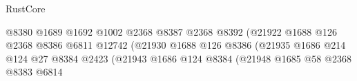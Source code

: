 \begin{lexlean}{RustCore}
\begin{coremodule}
                                                              @8380
                                                              @1689
                                                              @1692
                                                              @1002
                                                              @2368
                                                              @8387
                                                              @2368
                                                              @8392
                                                              (@21922
                                                                @1688
                                                                @126
                                                                @2368
                                                                @8386
                                                                @6811
                                                                @12742
                                                                (@21930
                                                                  @1688
                                                                  @126
                                                                  @8386
                                                                  (@21935
                                                                    @1686
                                                                    @214
                                                                    @124
                                                                    @27
                                                                    @8384
                                                                    @2423
                                                                    (@21943
                                                                      @1686
                                                                      @124
                                                                      @8384
                                                                      (@21948
                                                                        @1685
                                                                        @58
                                                                        @2368
                                                                        @8383
                                                                        @6814

\end{coremodule}
\end{lexlean}
